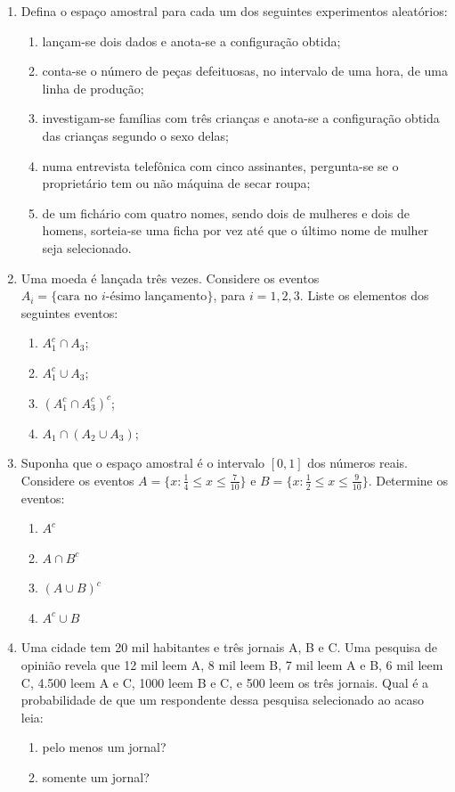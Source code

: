 \documentclass{article}
\begin{document}
\begin{enumerate}

    \item Defina o espaço amostral para cada um dos seguintes experimentos aleatórios:
    \begin{enumerate}
    	\item lançam-se dois dados e anota-se a configuração obtida;
    	\item conta-se o número de peças defeituosas, no intervalo de uma hora, de uma linha de produção;
    	\item investigam-se famílias com três crianças e anota-se a configuração obtida das crianças segundo o sexo delas;
    	\item numa entrevista telefônica com cinco assinantes, pergunta-se se o proprietário tem ou não máquina de secar roupa;
    	\item de um fichário com quatro nomes, sendo dois de mulheres e dois de homens, sorteia-se uma ficha por vez até que o último nome de mulher seja selecionado.
    \end{enumerate}
    
    \item Uma moeda é lançada três vezes. Considere os eventos $A_i = \{\text{cara no $i$-ésimo lançamento}\}$, para $i=1,2,3$. Liste os elementos dos seguintes eventos:
    \begin{enumerate}
    	\item $A_1^c \cap A_3$;
    	\item $A_1^c \cup A_3$;
    	\item $(A_1^c \cap A_3^c)^c$;
    	\item $A_1 \cap (A_2 \cup A_3)$;
    \end{enumerate}
    
    \item Suponha que o espaço amostral é o intervalo $[0,1]$ dos números reais. Considere os eventos $A=\{x: \frac{1}{4} \leq x \leq \frac{7}{10}\}$ e $B=\{x: \frac{1}{2} \leq x \leq \frac{9}{10}\}$. Determine os eventos:
    \begin{enumerate}
    	\item $A^c$
    	\item $A \cap B^c$
    	\item $(A \cup B)^c$
    	\item $A^c \cup B$
    \end{enumerate}
    
    \item Uma cidade tem 20 mil habitantes e três jornais A, B e C. Uma pesquisa de opinião revela que 12 mil leem A, 8 mil leem B, 7 mil leem A e B, 6 mil leem C, 4.500 leem A e C, 1000 leem B e C, e 500 leem os três jornais. Qual é a probabilidade de que um respondente dessa pesquisa selecionado ao acaso leia:
    \begin{enumerate}
    	\item pelo menos um jornal?
    	\item somente um jornal?
    \end{enumerate}
    

\end{enumerate}
\end{document}
